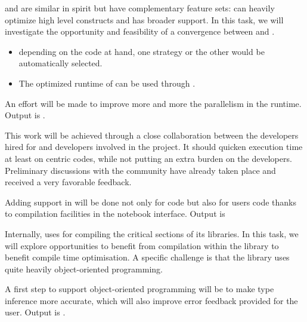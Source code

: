 \begin{workpackage}
\begin{tasklist}
\begin{task}[title=Pythran,id=pythran,lead=LL,partners={UJF},PM=24, wphases=0-24]
  \Pythran and \Cython are similar in spirit but have complementary feature
  sets: \Pythran can heavily optimize high level \Numpy constructs and \Cython
  has broader \Python support. In this task, we will investigate the
  opportunity and feasibility of a convergence between \Cython and \Pythran.
  \begin{itemize}
    \item depending on the code at hand, one strategy or the other would be automatically selected.
    \item The optimized runtime of \Pythran can be used through \Cython.
  \end{itemize}
  An effort will be made to improve more and more the parallelism in the
  \Pythran runtime. Output is .

  This work will be achieved through a close collaboration between the \Pythran
  developers hired for \TheProject and \Cython developers involved in the \Sage
  project. It should quicken \Sage execution time at least on \Numpy centric
  codes, while not putting an extra burden on the developers.  Preliminary
  discussions with the \Cython community have already taken place and received a
  very favorable feedback.

  Adding \Pythran support in \Sage will be done not only for \Sage code but also
  for \Sage users code thanks to compilation facilities in the notebook interface.
  Output is 


  Internally, \Sage uses \Cython for compiling the critical sections of
  its libraries. In this task, we will explore opportunities to
  benefit from \Pythran compilation within the \Sage library to benefit
  \Pythran compile time optimisation. A specific challenge is that the \Sage
  library uses quite heavily object-oriented programming.

  A first step to support object-oriented programming will be to make
  \Pythran type inference more accurate, which will also improve error
  feedback provided for the user. Output is .
\end{task}


\end{tasklist}
\end{workpackage}
